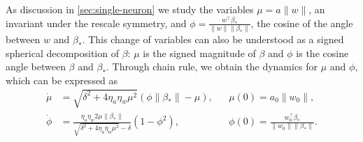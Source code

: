 \documentclass{article}
\theoremstyle{plain}
\theoremstyle{definition}
\theoremstyle{remark}
\begin{document}
As discussion in \cref{sec:single-neuron} we study the variables $\mu = a \|w\|$, an invariant under the rescale symmetry, and $\phi = \frac{w^\intercal \beta_*}{\|w\|\|\beta_*\|}$, the cosine of the angle between $w$ and $\beta_*$.
%
This change of variables can also be understood as a signed spherical decomposition of $\beta$: $\mu$ is the signed magnitude of $\beta$ and $\phi$ is the cosine angle between $\beta$ and $\beta_*$. Through chain rule, we obtain the dynamics for $\mu$ and $\phi$, which can be expressed as
\begin{align}
    \dot{\mu} &= \sqrt{\delta^2 + 4\eta_a\eta_w\mu^2}\left(\phi\|\beta_*\| - \mu\right), &&\mu(0)=a_0\|w_0\|,\\
    \dot{\phi} &= \frac{\eta_a\eta_w 2\mu\|\beta_*\|}{\sqrt{\delta^2 + 4\eta_a\eta_w\mu^2} - \delta} \left(1 - \phi^2\right), &&\phi(0)=\frac{w_0^\intercal \beta_*}{\|w_0\|\|\beta_*\|}.
\end{align}

\end{document}

